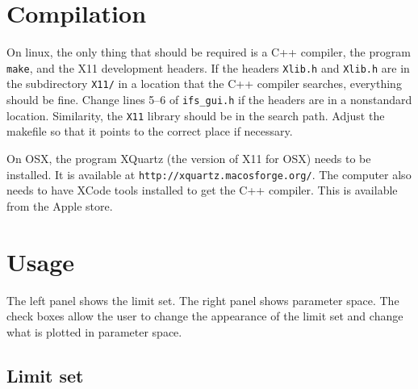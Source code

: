 \documentclass{amsart}
\begin{document}
\section{Compilation}

On linux, the only thing that should be required is a C++ compiler, the 
program \texttt{make}, and the X11 development headers.  
If the headers \texttt{Xlib.h} and \texttt{Xlib.h} are in 
the subdirectory \texttt{X11/} in a location that the C++ compiler 
searches, everything should be fine.  Change lines 5--6 of \verb|ifs_gui.h|
if the headers are in a nonstandard location.  Similarity, the \texttt{X11}
library should be in the search path.  Adjust the makefile so that it 
points to the correct place if necessary.

On OSX, the program XQuartz (the version of X11 for OSX) needs to be installed.
It is available at \texttt{http://xquartz.macosforge.org/}.  
The computer also needs to have XCode tools installed to get the 
C++ compiler.  This is available from the Apple store.

\section{Usage}

The left panel shows the limit set.  The right panel shows parameter space.  
The check boxes allow the user to change the appearance of the limit set 
and change what is plotted in parameter space.

\subsection{Limit set}
\end{document}

